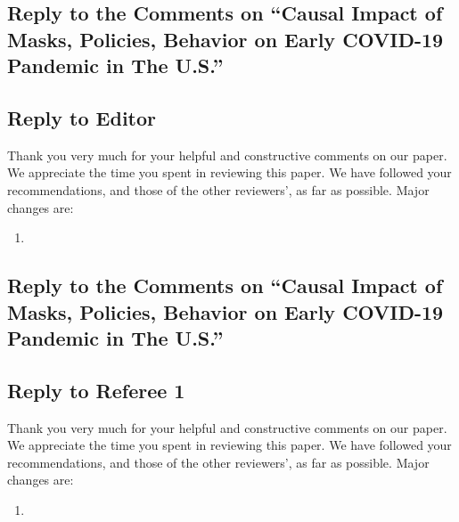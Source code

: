 \documentclass[11pt]{article}
\begin{document}
\newcommand{\replytitle}
{
\subsection*{Reply to the Comments on  ``Causal Impact of Masks, Policies, Behavior on Early COVID-19 Pandemic in The U.S.''}
}

\newcommand{\refreplyheading}
{Thank you very much for your helpful and constructive comments on our paper. We appreciate the time you spent in reviewing this paper. We have followed your recommendations, and those of the other reviewers', as far as possible.
Major changes are:}
 

\newcommand{\changes}
{
\begin{enumerate}

\item   
\end{enumerate}

}

\replytitle
\subsection*{Reply to Editor}
\refreplyheading
 
\changes

\newpage

\replytitle
\subsection*{Reply to Referee 1}
\refreplyheading

\changes
\end{document}
